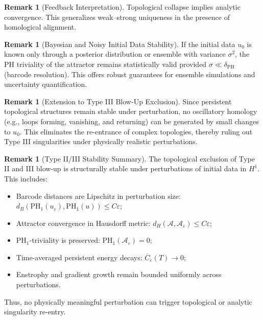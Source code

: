 \documentclass[11pt]{article}
\theoremstyle{definition}
\newtheorem{remark}[theorem]{Remark}
\begin{document}
\begin{remark}[Feedback Interpretation]
Topological collapse implies analytic convergence. This generalizes weak--strong uniqueness in the presence of homological alignment.
\end{remark}

\begin{remark}[Bayesian and Noisy Initial Data Stability]
If the initial data $u_0$ is known only through a posterior distribution or ensemble with variance $\sigma^2$, the PH triviality of the attractor remains statistically valid provided $\sigma \ll \delta_{\mathrm{PH}}$ (barcode resolution). This offers robust guarantees for ensemble simulations and uncertainty quantification.
\end{remark}

\begin{remark}[Extension to Type III Blow-Up Exclusion]
Since persistent topological structures remain stable under perturbation, no oscillatory homology (e.g., loops forming, vanishing, and returning) can be generated by small changes to $u_0$. This eliminates the re-entrance of complex topologies, thereby ruling out Type III singularities under physically realistic perturbations.
\end{remark}

\begin{remark}[Type II/III Stability Summary]
The topological exclusion of Type II and III blow-up is structurally stable under perturbations of initial data in $H^1$. This includes:
\begin{itemize}
    \item Barcode distances are Lipschitz in perturbation size: $d_B(\mathrm{PH}_1(u_\varepsilon), \mathrm{PH}_1(u)) \le C \varepsilon$;
    \item Attractor convergence in Hausdorff metric: $d_H(\mathcal{A}, \mathcal{A}_\varepsilon) \le C \varepsilon$;
    \item PH$_1$-triviality is preserved: $\mathrm{PH}_1(\mathcal{A}_\varepsilon) = 0$;
    \item Time-averaged persistent energy decays: $\overline{C}_\varepsilon(T) \to 0$;
    \item Enstrophy and gradient growth remain bounded uniformly across perturbations.
\end{itemize}
Thus, no physically meaningful perturbation can trigger topological or analytic singularity re-entry.
\end{remark}
\end{document}
